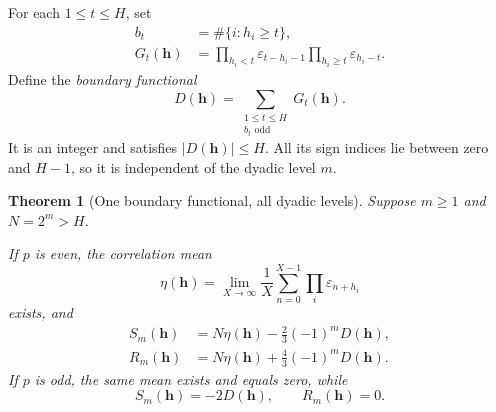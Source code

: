 \documentclass[11pt,oneside]{article}
\numberwithin{equation}{section}
\newtheorem{theorem}{Theorem}[section]
\theoremstyle{definition}
\theoremstyle{remark}
\newcommand{\eps}{\varepsilon}
\begin{document}
For each \(1\le t\le H\), set
\begin{align}
 b_t&=\#\{i:h_i\ge t\},\\
 G_t(\bm h)&=
 \prod_{h_i<t}\eps_{t-h_i-1}
 \prod_{h_i\ge t}\eps_{h_i-t}.
 \label{eq:Gt}
\end{align}
Define the \emph{boundary functional}
\begin{equation}
 D(\bm h)=\sum_{\substack{1\le t\le H\\b_t\text{ odd}}}G_t(\bm h).
 \label{eq:defect}
\end{equation}
It is an integer and satisfies \(|D(\bm h)|\le H\). All its sign indices lie
between zero and \(H-1\), so it is independent of the dyadic level \(m\).

\begin{theorem}[One boundary functional, all dyadic levels]
\label{thm:boundary}
Suppose \(m\ge1\) and \(N=2^m>H\).

If \(p\) is even, the correlation mean
\begin{equation}
 \eta(\bm h)=\lim_{X\to\infty}\frac1X
       \sum_{n=0}^{X-1}\prod_i\eps_{n+h_i}
 \label{eq:eta}
\end{equation}
exists, and
\begin{align}
 S_m(\bm h)&=N\eta(\bm h)-\frac23(-1)^mD(\bm h),
 \label{eq:evenS}\\
 R_m(\bm h)&=N\eta(\bm h)+\frac43(-1)^mD(\bm h).
 \label{eq:evenR}
\end{align}
If \(p\) is odd, the same mean exists and equals zero, while
\begin{equation}
 S_m(\bm h)=-2D(\bm h),\qquad R_m(\bm h)=0.
 \label{eq:oddS}
\end{equation}
\end{theorem}
\end{document}
